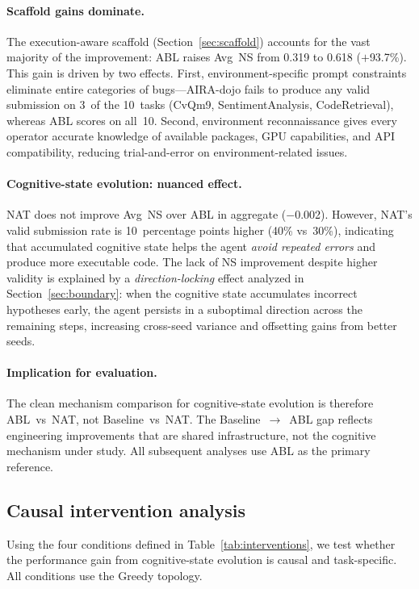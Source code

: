 \documentclass{article} %
\begin{document}
\paragraph{Scaffold gains dominate.}
The execution-aware scaffold (Section~\ref{sec:scaffold}) accounts for the
vast majority of the improvement: ABL raises Avg~NS from 0.319 to 0.618
($+$93.7\%). This gain is driven by two effects. First, environment-specific
prompt constraints eliminate entire categories of bugs---AIRA-dojo fails to
produce any valid submission on 3~of the 10~tasks (CvQm9,
SentimentAnalysis, CodeRetrieval), whereas ABL scores on all~10. Second,
environment reconnaissance gives every operator accurate knowledge of
available packages, GPU capabilities, and API compatibility, reducing
trial-and-error on environment-related issues.

\paragraph{Cognitive-state evolution: nuanced effect.}
NAT does not improve Avg~NS over ABL in aggregate ($-$0.002). However, NAT's
valid submission rate is 10~percentage points higher (40\% vs~30\%),
indicating that accumulated cognitive state helps the agent \emph{avoid
repeated errors} and produce more executable code. The lack of NS improvement
despite higher validity is explained by a \emph{direction-locking} effect
analyzed in Section~\ref{sec:boundary}: when the cognitive state accumulates
incorrect hypotheses early, the agent persists in a suboptimal direction
across the remaining steps, increasing cross-seed variance and offsetting
gains from better seeds.

\paragraph{Implication for evaluation.}
The clean mechanism comparison for cognitive-state evolution is therefore
ABL~vs~NAT, not Baseline~vs~NAT. The Baseline~$\to$~ABL gap reflects
engineering improvements that are shared infrastructure, not the cognitive
mechanism under study. All subsequent analyses use ABL as the primary
reference.


\subsection{Causal intervention analysis}
\label{sec:causal}

Using the four conditions defined in Table~\ref{tab:interventions}, we test
whether the performance gain from cognitive-state evolution is causal and
task-specific. All conditions use the Greedy topology.
\end{document}
